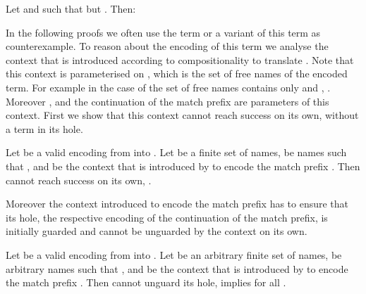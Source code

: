 \documentclass[final,copyright,creativecommons]{eptcs}
\begin{document}
\begin{lemma}
	\label{prop:newCom}
	Let  and  such that  but .
	Then:
	\vspace{-0.5em}
	
\end{lemma}

In the following proofs we often use the term  or a variant of this term as counterexample. To reason about the encoding of this term we analyse the context  that is introduced according to compositionality to translate . Note that this context is parameterised on , which is the set of free names of the encoded term. For example in the case of  the set of free names contains only  and , \ie . Moreover ,  and the continuation of the match prefix are parameters of this context. First we show that this context cannot reach success on its own, \ie without a term in its hole.

\begin{lemma}
	\label{lem:contextCannotReachSuccess}
	Let \encod be a valid encoding from \piT into \piNM.
	Let  be a finite set of names,
	 be names such that ,
	and  be the context that is introduced by  to encode the match prefix . Then  cannot reach success on its own, \ie .
\end{lemma}

Moreover the context introduced to encode the match prefix has to ensure that its hole, \ie the respective encoding of the continuation of the match prefix, is initially guarded and cannot be unguarded by the context on its own.

\begin{lemma}
	\label{lem:contextNotUnguardContinuation}
	Let \encod be a valid encoding from \piT into \piNM.
	Let  be an arbitrary finite set of names,
	 be arbitrary names such that ,
	and  be the context that is introduced by  to encode the match prefix . Then  cannot unguard its hole, \ie  implies  for all .
\end{lemma}
\end{document}
